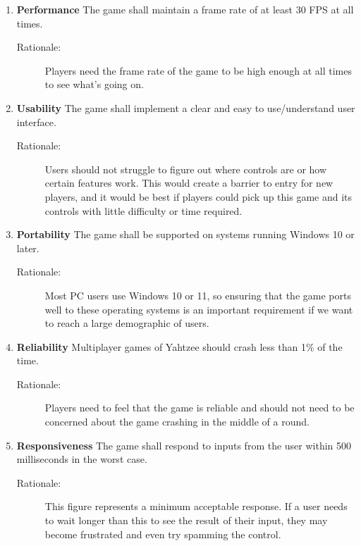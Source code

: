 \begin{enumerate}[label=NFR\arabic*, start=1, left=0pt]

    \item \label{NFR1} \textbf{Performance} The game shall maintain a frame rate of at least 30 FPS at all times.
    \begin{description}
        \item[Rationale:] Players need the frame rate of the game to be high enough at all times to see what’s going on.
    \end{description}

    \item \label{NFR2} \textbf{Usability} The game shall implement a clear and easy to use/understand user interface.
    \begin{description}
        \item[Rationale:] Users should not struggle to figure out where controls are or how certain features work. This would create a barrier to entry for new players, and it would be best if players could pick up this game and its controls with little difficulty or time required.
    \end{description}

    \item \label{NFR3} \textbf{Portability} The game shall be supported on systems running Windows 10 or later.
    \begin{description}
        \item[Rationale:] Most PC users use Windows 10 or 11, so ensuring that the game ports well to these operating systems is an important requirement if we want to reach a large demographic of users.
    \end{description}

    \item \label{NFR4} \textbf{Reliability} Multiplayer games of Yahtzee should crash less than 1\% of the time.
    \begin{description}
        \item[Rationale:] Players need to feel that the game is reliable and should not need to be concerned about the game crashing in the middle of a round.
    \end{description}

    \item \label{NFR5} \textbf{Responsiveness} The game shall respond to inputs from the user within 500 milliseconds in the worst case.
    \begin{description}
        \item[Rationale:] This figure represents a minimum acceptable response. If a user needs to wait longer than this to see the result of their input, they may become frustrated and even try spamming the control.
    \end{description}


\end{enumerate}
